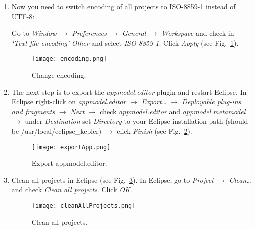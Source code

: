 \documentclass[10pt,a4paper]{article}
\begin{document}
\begin{enumerate}
\item{}Now you need to switch encoding of all projects to ISO-8859-1 instead of UTF-8: 

Go to \textit{Window} $\rightarrow$ \textit{Preferences} $\rightarrow$ \textit{General} $\rightarrow$ \textit{Workspace} and check in \textit{`Text file encoding'} \textit{Other} and select \textit{ISO-8859-1}. Click \textit{Apply} (see Fig.~\ref{fig:encoding}).

\begin{figure}[h!tp]
\begin{center}
%
\texttt{[image: encoding.png]}
%
\end{center}
%
\caption{Change encoding.}
\label{fig:encoding}
%
\end{figure}

\item{}The next step is to export the \textit{appmodel.editor} plugin and restart Eclipse. In Eclipse right-click on \textit{appmodel.editor} $\rightarrow$ \textit{Export\ldots} $\rightarrow$ \textit{Deployable plug-ins and fragments} $\rightarrow$ \textit{Next} $\rightarrow$ check \textit{appmodel.editor} and \textit{appmodel.metamodel} $\rightarrow$ under \textit{Destination} set \textit{Directory} to your Eclipse installation path (should be /usr/local/eclipse\_kepler) $\rightarrow$ click \textit{Finish} (see Fig.~\ref{fig:exportAppmodel}). 

\begin{figure}[h!tp]
\begin{center}

\texttt{[image: exportApp.png]}
%
\end{center}
%
\caption{Export appmodel.editor.}
\label{fig:exportAppmodel}
%
\end{figure}

\item{}Clean all projects in Eclipse (see Fig.~\ref{fig:clean}). In Eclipse, go to \textit{Project} $\rightarrow$ \textit{Clean\ldots} and check \textit{Clean all projects}. Click \textit{OK}.

\begin{figure}[h!tp]
\begin{center}

\texttt{[image: cleanAllProjects.png]}
%
\end{center}
%
\caption{Clean all projects.}
\label{fig:clean}
%
\end{figure}


\end{enumerate}
\end{document}
